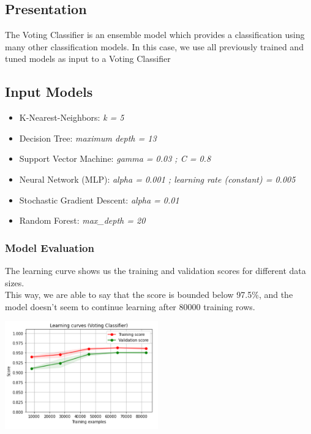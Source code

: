 \subsection{Presentation}
The Voting Classifier is an ensemble model which provides a classification using many other classification models.
In this case, we use all previously trained and tuned models as input to a Voting Classifier

\subsection{Input Models}
\begin{itemize}
    \item K-Nearest-Neighbors: \emph{k = 5}
    \item Decision Tree: \emph{maximum depth = 13}
    \item Support Vector Machine: \emph{gamma = 0.03 ; C = 0.8}
    \item Neural Network (MLP): \emph{alpha = 0.001 ; learning rate (constant) = 0.005}
    \item Stochastic Gradient Descent: \emph{alpha = 0.01}
    \item Random Forest: \emph{max\_depth = 20}
\end{itemize}

\subsubsection{Model Evaluation}
The learning curve shows us the training and validation scores for different data sizes.\\
This way, we are able to say that the score is bounded below 97.5\%, and the model doesn't seem to continue learning after 80000 training rows.
\begin{center}
    \captionsetup{type=figure}
    \includegraphics[width=250px]{learning_curve_voting.png}
\end{center}
